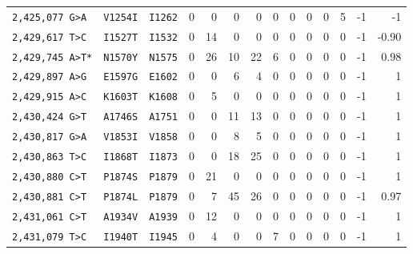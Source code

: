 \begin{tabular}{lllrrrrrrrrrrr}
\texttt{2,425,077 G>A} & \texttt{V1254I} & \texttt{I1262} & 0 & 0 & 0 & 0 & 0 & 0 & 0 & 0 & 5 & -1 & -1 \\

\texttt{2,429,617 T>C} & \texttt{I1527T} & \texttt{I1532} & 0 & 14 & 0 & 0 & 0 & 0 & 0 & 0 & 0 & -1 & -0.90 \\

\texttt{2,429,745 A>T*} & \texttt{N1570Y} & \texttt{N1575} & 0 & 26 & 10 & 22 & 6 & 0 & 0 & 0 & 0 & -1 & 0.98 \\

\texttt{2,429,897 A>G} & \texttt{E1597G} & \texttt{E1602} & 0 & 0 & 6 & 4 & 0 & 0 & 0 & 0 & 0 & -1 & 1 \\

\texttt{2,429,915 A>C} & \texttt{K1603T} & \texttt{K1608} & 0 & 5 & 0 & 0 & 0 & 0 & 0 & 0 & 0 & -1 & 1 \\

\texttt{2,430,424 G>T} & \texttt{A1746S} & \texttt{A1751} & 0 & 0 & 11 & 13 & 0 & 0 & 0 & 0 & 0 & -1 & 1 \\

\texttt{2,430,817 G>A} & \texttt{V1853I} & \texttt{V1858} & 0 & 0 & 8 & 5 & 0 & 0 & 0 & 0 & 0 & -1 & 1 \\

\texttt{2,430,863 T>C} & \texttt{I1868T} & \texttt{I1873} & 0 & 0 & 18 & 25 & 0 & 0 & 0 & 0 & 0 & -1 & 1 \\

\texttt{2,430,880 C>T} & \texttt{P1874S} & \texttt{P1879} & 0 & 21 & 0 & 0 & 0 & 0 & 0 & 0 & 0 & -1 & 1 \\

\texttt{2,430,881 C>T} & \texttt{P1874L} & \texttt{P1879} & 0 & 7 & 45 & 26 & 0 & 0 & 0 & 0 & 0 & -1 & 0.97 \\

\texttt{2,431,061 C>T} & \texttt{A1934V} & \texttt{A1939} & 0 & 12 & 0 & 0 & 0 & 0 & 0 & 0 & 0 & -1 & 1 \\

\texttt{2,431,079 T>C} & \texttt{I1940T} & \texttt{I1945} & 0 & 4 & 0 & 0 & 7 & 0 & 0 & 0 & 0 & -1 & 1 \\

\bottomrule
\end{tabular}
